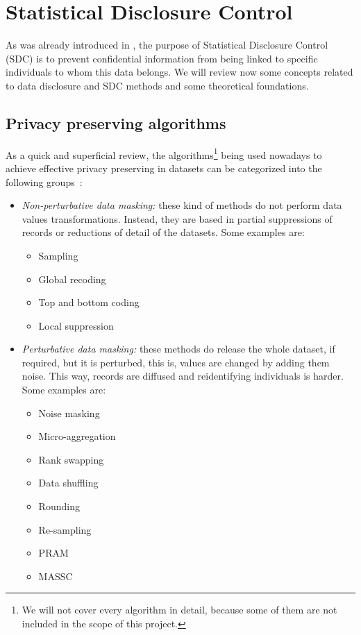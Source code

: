 \section{Statistical Disclosure Control}
\label{Theory:SDC}

As was already introduced in , the purpose of Statistical Disclosure Control (SDC) is to prevent confidential information from being linked to specific individuals to whom this data belongs. We will review now some concepts related to data disclosure and SDC methods and some theoretical foundations.

\subsection{Privacy preserving algorithms} 
\label{Theory:SDC:Algorithms}

As a quick and superficial review, the algorithms\footnote{We will not cover every algorithm in detail, because some of them are not included in the scope of this project.} being used nowadays to achieve effective privacy preserving in datasets can be categorized into the following groups~\cite{Hundepool:StatisticalDisclosureControl}:

\begin{itemize}
	\item \textit{Non-perturbative data masking:} these kind of methods do not perform data values transformations. Instead, they are based in partial suppressions of records or reductions of detail of the datasets. Some examples are:
	\begin{itemize}
		\item Sampling
		\item Global recoding
		\item Top and bottom coding
		\item Local suppression
	\end{itemize}

	\item \textit{Perturbative data masking:} these methods do release the whole dataset, if required, but it is perturbed, this is, values are changed by adding them noise. This way, records are diffused and reidentifying individuals is harder. Some examples are:
	\begin{itemize}
		\item Noise masking
		\item Micro-aggregation
		\item Rank swapping
		\item Data shuffling
		\item Rounding
		\item Re-sampling
		\item PRAM
		\item MASSC
	\end{itemize}
\end{itemize}

